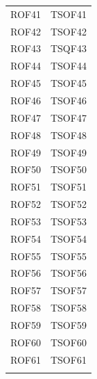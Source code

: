 \documentclass[../PianoDiQualifica_v4.0.0.tex]{subfiles}
\begin{document}
\begin{longtable}[c] { >{\centering\arraybackslash}p{3cm} >{\centering\arraybackslash}p{3cm}}
			\addlinespace[0.3em]
			\midrule
			\addlinespace[0.3em]
			ROF41 & TSOF41 \\
			\addlinespace[0.3em]
			\midrule
			\addlinespace[0.3em]
			ROF42 & TSOF42 \\
			\addlinespace[0.3em]
			\midrule
			\addlinespace[0.3em]
			ROF43 & TSQF43 \\
			\addlinespace[0.3em]
			\midrule
			\addlinespace[0.3em]
			ROF44 & TSOF44 \\
			\addlinespace[0.3em]
			\midrule
			\addlinespace[0.3em]
			ROF45 & TSOF45 \\
			\addlinespace[0.3em]
			\midrule
			\addlinespace[0.3em]
			ROF46 & TSOF46 \\
			\addlinespace[0.3em]
			\midrule
			\addlinespace[0.3em]
			ROF47 & TSOF47 \\
			\addlinespace[0.3em]
			\midrule
			\addlinespace[0.3em]
			ROF48 & TSOF48 \\
			\addlinespace[0.3em]
			\midrule
			\addlinespace[0.3em]
			ROF49 & TSOF49 \\
			\addlinespace[0.3em]
			\midrule
			\addlinespace[0.3em]
			ROF50 & TSOF50 \\
			\addlinespace[0.3em]
			\midrule
			\addlinespace[0.3em]
			ROF51 & TSOF51 \\
			\addlinespace[0.3em]
			\midrule
			\addlinespace[0.3em]
			ROF52 & TSOF52 \\
			\addlinespace[0.3em]
			\midrule
			\addlinespace[0.3em]
			ROF53 & TSOF53 \\
			\addlinespace[0.3em]
			\midrule
			\addlinespace[0.3em]
			ROF54 & TSOF54 \\
			\addlinespace[0.3em]
			\midrule
			\addlinespace[0.3em]
			ROF55 & TSOF55 \\
			\addlinespace[0.3em]
			\midrule
			\addlinespace[0.3em]
			ROF56 & TSOF56 \\
			\addlinespace[0.3em]
			\midrule
			\addlinespace[0.3em]
			ROF57 & TSOF57 \\
			\addlinespace[0.3em]
			\midrule
			\addlinespace[0.3em]
			ROF58 & TSOF58 \\
			\addlinespace[0.3em]
			\midrule
			\addlinespace[0.3em]
			ROF59 & TSOF59 \\
			\addlinespace[0.3em]
			\midrule
			\addlinespace[0.3em]
			ROF60 & TSOF60 \\
			\addlinespace[0.3em]
			\midrule
			\addlinespace[0.3em]
			ROF61 & TSOF61 \\
			\addlinespace[0.3em]
			\midrule
			\addlinespace[0.3em]

\end{longtable}
\end{document}

